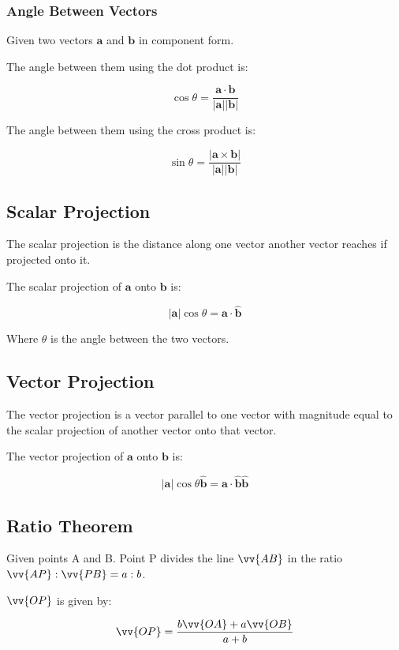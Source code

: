 \documentclass[a4paper,11pt]{article}
\newcommand{\bb}{\boldsymbol}
\begin{document}
\subsubsection{Angle Between Vectors}

Given two vectors $\bb{a}$ and $\bb{b}$ in component form.

The angle between them using the dot product is:

$$
\cos{\theta} = \frac{\bb{a} \cdot \bb{b}}{\lvert \bb{a} \rvert \lvert \bb{b} \rvert}
$$

The angle between them using the cross product is:

$$
\sin{\theta} = \frac{\lvert \bb{a} \times \bb{b} \rvert}{\lvert \bb{a} \rvert \lvert \bb{b} \rvert}
$$


\subsection{Scalar Projection}

The scalar projection is the distance along one vector another vector reaches if
projected onto it.

The scalar projection of $\bb{a}$ onto $\bb{b}$ is:

$$
\lvert \bb{a} \rvert \cos{\theta} = \bb{a} \cdot \hat{\bb{b}}
$$

Where $\theta$ is the angle between the two vectors.


\subsection{Vector Projection}

The vector projection is a vector parallel to one vector with magnitude equal to
the scalar projection of another vector onto that vector.

The vector projection of $\bb{a}$ onto $\bb{b}$ is:

$$
\lvert \bb{a} \rvert \cos{\theta} \hat{\bb{b}} = \bb{a} \cdot \hat{\bb{b}} \hat{\bb{b}}
$$


\subsection{Ratio Theorem}

Given points A and B. Point P divides the line $\vv{AB}$ in the ratio
$\vv{AP} : \vv{PB} = a : b$.

$\vv{OP}$ is given by:

$$
\vv{OP} = \frac{b\vv{OA} + a\vv{OB}}{a + b}
$$
\end{document}
